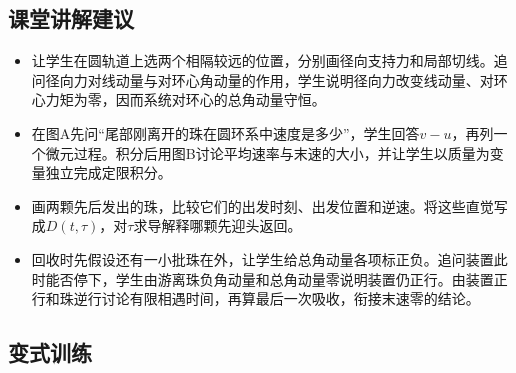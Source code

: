 \documentclass[UTF8,fontset=fandol,a4paper,11pt]{ctexart}
\begin{document}


\subsection*{课堂讲解建议}

\begin{itemize}
\item 让学生在圆轨道上选两个相隔较远的位置，分别画径向支持力和局部切线。追问径向力对线动量与对环心角动量的作用，学生说明径向力改变线动量、对环心力矩为零，因而系统对环心的总角动量守恒。
\item 在图A先问“尾部刚离开的珠在圆环系中速度是多少”，学生回答$v-u$，再列一个微元过程。积分后用图B讨论平均速率与末速的大小，并让学生以质量为变量独立完成定限积分。
\item 画两颗先后发出的珠，比较它们的出发时刻、出发位置和逆速。将这些直觉写成$D(t,\tau)$，对$\tau$求导解释哪颗先迎头返回。
\item 回收时先假设还有一小批珠在外，让学生给总角动量各项标正负。追问装置此时能否停下，学生由游离珠负角动量和总角动量零说明装置仍正行。由装置正行和珠逆行讨论有限相遇时间，再算最后一次吸收，衔接末速零的结论。
\end{itemize}



\subsection*{变式训练}
\end{document}
